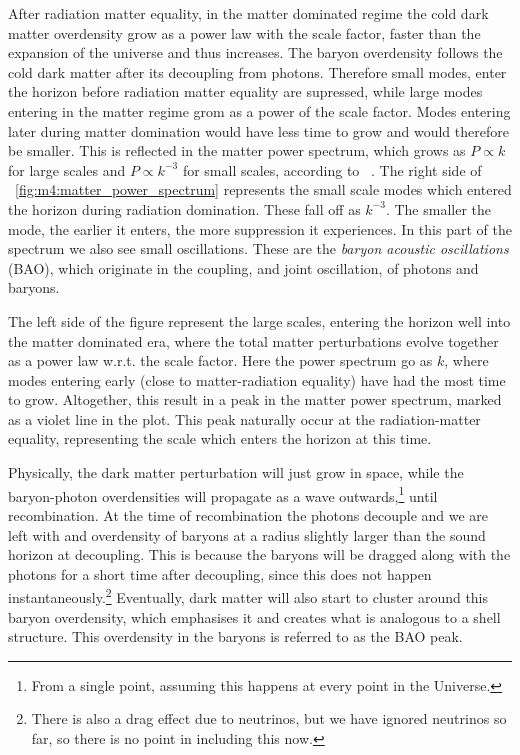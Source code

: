         After radiation matter equality, in the matter dominated regime the cold dark matter overdensity grow as a power law with the scale factor, faster than the expansion of the universe and thus increases. The baryon overdensity follows the cold dark matter after its decoupling from photons. Therefore small modes, enter the horizon before radiation matter equality are supressed, while large modes entering in the matter regime grom as a power of the scale factor. Modes entering later during matter domination would have less time to grow and would therefore be smaller.  This is reflected in the matter power spectrum, which grows as $P\propto k$ for large scales and $P\propto k^{-3}$ for small scales, according to ~\cite{dodelson2020modern}. The right side of ~\cref{fig:m4:matter_power_spectrum} represents the small scale modes which entered the horizon during radiation domination. These fall off as $k^{-3}$. The smaller the mode, the earlier it enters, the more suppression it experiences. In this part of the spectrum we also see small oscillations. These are the \textit{baryon acoustic oscillations} (BAO), which originate in the coupling, and joint oscillation, of photons and baryons. 
        
        The left side of the figure represent the large scales, entering the horizon well into the matter dominated era, where the total matter perturbations evolve together as a power law w.r.t. the scale factor. Here the power spectrum go as $k$, where modes entering early (close to matter-radiation equality) have had the most time to grow. Altogether, this result in a peak in the matter power spectrum, marked as a violet line in the plot. This peak naturally occur at the radiation-matter equality, representing the scale which enters the horizon at this time. 

        Physically, the dark matter perturbation will just grow in space, while the baryon-photon overdensities will propagate as a wave outwards,\footnote{From a single point, assuming this happens at every point in the Universe.} until recombination. At the time of recombination the photons decouple and we are left with and overdensity of baryons at a radius slightly larger than the sound horizon at decoupling. This is because the baryons will be dragged along with the photons for a short time after decoupling, since this does not happen instantaneously.\footnote{There is also a drag effect due to neutrinos, but we have ignored neutrinos so far, so there is no point in including this now.} Eventually, dark matter will also start to cluster around this baryon overdensity, which emphasises it and creates what is analogous to a shell structure. This overdensity in the baryons is referred to as the BAO peak. 

